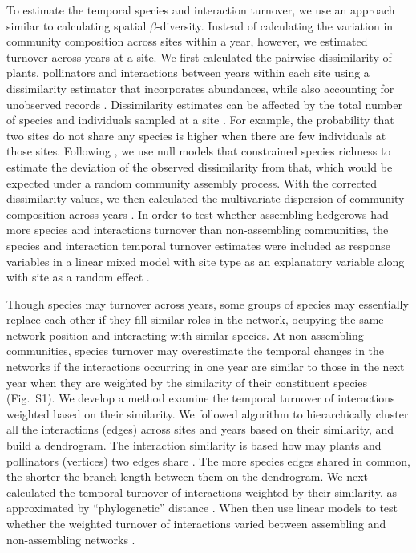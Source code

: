 \documentclass[12pt]{article}
\newcommand{\flagged}[1] {
  \textcolor{blue}{#1}
}
\providecommand{\DIFaddtex}[1]{{\protect\color{blue}\uwave{#1}}} %
\providecommand{\DIFdeltex}[1]{{\protect\color{red}\sout{#1}}}                      %
\providecommand{\DIFaddbegin}{} %
\providecommand{\DIFaddend}{} %
\providecommand{\DIFdelbegin}{} %
\providecommand{\DIFdelend}{} %
\providecommand{\DIFadd}[1]{\texorpdfstring{\DIFaddtex{#1}}{#1}} %
\providecommand{\DIFdel}[1]{\texorpdfstring{\DIFdeltex{#1}}{}} %
\begin{document}
To estimate the temporal species and interaction turnover, we use an
approach similar to calculating spatial $\beta$-diversity. Instead of
calculating the variation in community composition across sites within
a year, however, we estimated turnover across years at a site. We
first calculated the pairwise dissimilarity of plants, pollinators and
interactions between years within each site using a dissimilarity
estimator \DIFaddbegin \DIFadd{\flagged{I think it would be nice to state which measure you use. Marilia - I think we explain it in the next sentences} }\DIFaddend that incorporates abundances, while also accounting for
unobserved records \citep{chao-2005-148}. Dissimilarity estimates can
be affected by the total number of species and individuals sampled at
a site \citep[e.g.,][]{ponisio2015farm}. For example, the probability
that two sites do not share any species is higher when there are few
individuals at those sites. Following \cite{ponisio2015farm}, we use
null models that constrained species richness to estimate the
deviation of the observed dissimilarity from that, which would be
expected under a random community assembly process. With the corrected
dissimilarity values, we then calculated the multivariate dispersion
of community composition across years \citep{anderson-2011-19}. In
order to test whether assembling hedgerows had more species and
interactions turnover than non-assembling communities, the species and
interaction temporal turnover estimates were included as response
variables in a linear mixed model with site type as an explanatory
variable along with site as a random effect \citep{lme4, lmetest}.

Though species may turnover across years, some groups of species may
essentially replace each other if they fill similar roles in the
network, ocupying the same network position and interacting with
similar species. At non-assembling communities, species turnover may
overestimate the temporal changes in the networks if the interactions
occurring in one year are similar to those in the next year when they
are weighted by the similarity of their constituent species
(Fig.~S1). We develop a method \DIFaddbegin \DIFadd{to }\DIFaddend examine the temporal turnover of
interactions \DIFdelbegin \DIFdel{weighted }\DIFdelend \DIFaddbegin \DIFadd{with weightings }\DIFaddend based on their similarity. We followed
\cite{ahn2010link} algorithm to hierarchically cluster all the
interactions (edges) across sites and years based on their similarity,
and build a dendrogram. The interaction similarity is based how may
plants and pollinators (vertices) two edges share \citep{ahn2010link,
  kalinka2011linkcomm}. The more species edges shared in common, the
shorter the branch length between them on the dendrogram.  We next
calculated the temporal turnover of interactions weighted by their
similarity, as approximated by ``phylogenetic'' distance
\citep{graham2008phylogenetic, picante-2010-1463}. When then use
linear models to test whether the weighted turnover of interactions
varied between assembling and non-assembling networks \citep{lme4,
  lmetest}.
\end{document}
